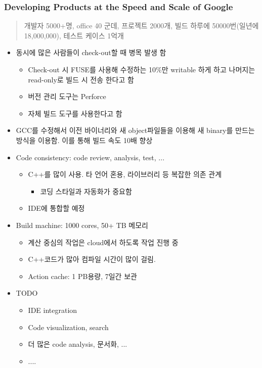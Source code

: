 \begin{frame}[allowframebreaks]
\frametitle{Developing Products at the Speed and Scale of Google}

\begin{quote}
개발자 5000+명, office 40 군데, 프로젝트 2000개, 빌드 하루에 50000번(일년에 18,000,000), 테스트 케이스 1억개
\end{quote}

\begin{itemize}
\item 동시에 많은 사람들이 check-out할 때 병목 발생 함
    \begin{itemize}
    \item Check-out 시 FUSE를 사용해 수정하는 10\%만 writable 하게 하고 나머지는 read-only로 빌드 시 전송 한다고 함
    \item 버전 관리 도구는 Perforce
    \item 자체 빌드 도구를 사용한다고 함
    \end{itemize}
\item GCC를 수정해서  이전 바이너리와 새 object파일들을 이용해 새 binary를 만드는 방식을 이용함. 이를 통해 빌드 속도 10배 향상

\item Code consistency: code review, analysis, test, ...
    \begin{itemize}
    \item C++를 많이 사용. 타 언어 혼용, 라이브러리 등 복잡한 의존 관계
      \begin{itemize}
      \item 코딩 스타일과 자동화가 중요함
      \end{itemize}
    \item IDE에 통합할 예정
    \end{itemize}

\item Build machine: 1000 cores, 50+ TB 메모리
    \begin{itemize}
    \item 계산 중심의 작업은 cloud에서 하도록 작업 진행 중
    \item C++코드가 많아 컴파일 시간이 많이 걸림.
    \item Action cache: 1 PB용량, 7일간 보관
    \end{itemize}

\pagebreak

\item TODO
    \begin{itemize}
    \item IDE integration 
    \item Code  visualization, search
    \item 더 많은 code analysis, 문서화, ...
    \item .... 
    \end{itemize}
\end{itemize}

\end{frame}
